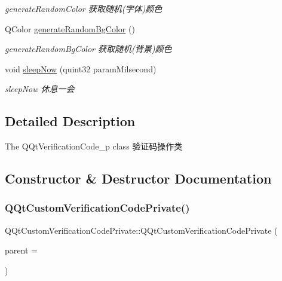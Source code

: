 \begin{DoxyCompactItemize}
\begin{DoxyCompactList}\small\item\em generate\+Random\+Color 获取随机(字体)颜色 \end{DoxyCompactList}\item 
Q\+Color \mbox{\hyperlink{class_q_qt_custom_verification_code_private_a53c0f421195a09594d1df5422cd7231f}{generate\+Random\+Bg\+Color}} ()
\begin{DoxyCompactList}\small\item\em generate\+Random\+Bg\+Color 获取随机(背景)颜色 \end{DoxyCompactList}\item 
void \mbox{\hyperlink{class_q_qt_custom_verification_code_private_a46d079ea663498dd608d356971ac2891}{sleep\+Now}} (quint32 param\+Milsecond)
\begin{DoxyCompactList}\small\item\em sleep\+Now 休息一会 \end{DoxyCompactList}\end{DoxyCompactItemize}


\subsection{Detailed Description}
The Q\+Qt\+Verification\+Code\+\_\+p class 验证码操作类 

\subsection{Constructor \& Destructor Documentation}
\mbox{\label{class_q_qt_custom_verification_code_private_a43eebe59ec9c2544aff984b5e211569d}} 
\subsubsection{\texorpdfstring{Q\+Qt\+Custom\+Verification\+Code\+Private()}{QQtCustomVerificationCodePrivate()}}
{\footnotesize\ttfamily Q\+Qt\+Custom\+Verification\+Code\+Private\+::\+Q\+Qt\+Custom\+Verification\+Code\+Private (\begin{DoxyParamCaption}\item[{Q\+Object $\ast$}]{parent = {} }\end{DoxyParamCaption})\hspace{0.3cm}{\ttfamily [explicit]}}



